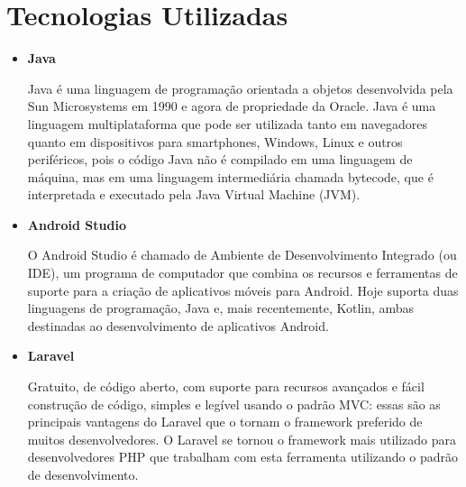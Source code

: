 \section{Tecnologias Utilizadas} 

\begin{itemize}
	\item \textbf{Java}
	
	Java é uma linguagem de programação orientada a objetos desenvolvida pela Sun Microsystems em 1990 e agora de propriedade da Oracle. Java é uma linguagem multiplataforma que pode ser utilizada tanto em navegadores quanto em dispositivos para smartphones, Windows, Linux e outros periféricos, pois o código Java não é compilado em uma linguagem de máquina, mas em uma linguagem intermediária chamada bytecode, que é interpretada e executado pela Java Virtual Machine (JVM).
	
	\item \textbf{Android Studio}
	
	O Android Studio é chamado de Ambiente de Desenvolvimento Integrado (ou IDE), um programa de computador que combina os recursos e ferramentas de suporte para a criação de aplicativos móveis para Android. Hoje suporta duas linguagens de programação, Java e, mais recentemente, Kotlin, ambas destinadas ao desenvolvimento de aplicativos Android.
	
	\item \textbf{Laravel}
	
	Gratuito, de código aberto, com suporte para recursos avançados e fácil construção de código, simples e legível usando o padrão MVC: essas são as principais vantagens do Laravel que o tornam o framework preferido de muitos desenvolvedores. O Laravel se tornou o framework mais utilizado para desenvolvedores PHP que trabalham com esta ferramenta utilizando o padrão de desenvolvimento.%
	

\end{itemize}
